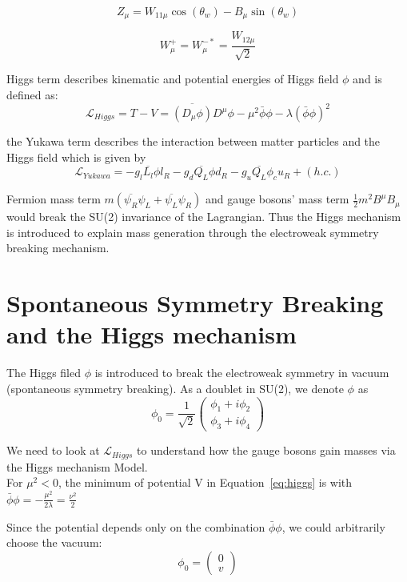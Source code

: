 \begin{equation*}
  Z_\mu=W_{11\mu}\cos\left(\theta_w\right)-B_\mu\sin\left(\theta_w\right)
\end{equation*}

\begin{equation*}
  W_\mu^+=W_\mu^{-*}=\frac{W_{12\mu}}{\sqrt{2}}
\end{equation*}

\par Higgs term describes kinematic and potential energies of Higgs field $\phi$ and is defined as:
\begin{equation}
  \mathcal{L}_{Higgs}= T-V =\overline{\left(D_\mu\phi\right)}D^\mu\phi-\mu^2\bar{\phi}\phi-\lambda(\bar{\phi}\phi)^2
  \label{eq:higgs}
\end{equation}

the Yukawa term describes the interaction between matter particles and the Higgs field which is given by
\begin{equation}
  \mathcal{L}_{Yukawa} = - g_l \overline{L_l}\phi l_R - g_d\overline{Q_L}\phi d_R -  g_u\overline{Q_L}\phi_c u_R + (h.c.)
  \label{eq:yukawa}
\end{equation}
\par Fermion mass term $m(\overline{\psi_R}\psi_L+\overline{\psi_L}\psi_R)$ and gauge bosons' mass term $\frac{1}{2}m^2 B^\mu B_\mu$ would break the SU(2) invariance of the Lagrangian. Thus the Higgs mechanism is introduced to explain mass generation through the electroweak symmetry breaking mechanism.

\section{Spontaneous Symmetry Breaking and the Higgs mechanism}
\par The Higgs filed $\phi$ is introduced to break the electroweak symmetry in vacuum (spontaneous symmetry breaking).
As a doublet in SU(2), we denote $\phi$ as
\begin{equation}
  \phi_0=\frac{1}{\sqrt{2}}\left( \begin{smallmatrix} \phi_1+i\phi_2\\ \phi_3+i\phi_4 \end{smallmatrix}\right)
  \label{eq:higgsfield}
\end{equation}

\par We need to look at $ \mathcal{L}_{Higgs}$ to understand how the gauge bosons gain masses via the Higgs mechanism Model.\\
For $\mu^2<0$, the minimum of potential V in Equation~\ref{eq:higgs} is with $\bar{\phi}\phi=-\frac{\mu^2}{2\lambda}=\frac{\nu^2}{2}$
\par Since the potential depends only on the combination $\bar{\phi}\phi$, we could arbitrarily choose the vacuum:
\begin{equation}
  \phi_0=\left( \begin{smallmatrix} 0\\v \end{smallmatrix}\right)
\end{equation}

